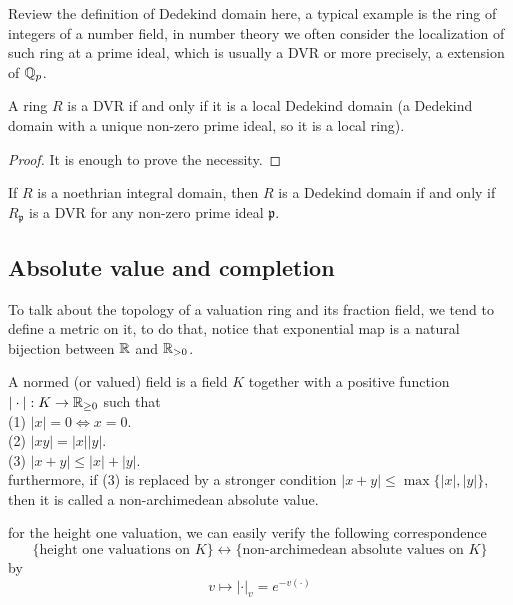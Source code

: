 Review the definition of Dedekind domain here, a typical example is the ring of integers of a number field, in number theory we often consider the localization of such ring at a prime ideal, which is usually a DVR or more precisely, a extension of \(\mathbb{Q}_p\).

\begin{proposition}
    A ring \(R\) is a DVR if and only if it is a local Dedekind domain (a Dedekind domain with a unique non-zero prime ideal, so it is a local ring).
\end{proposition}

\begin{proof}
    It is enough to prove the necessity.
\end{proof}

\begin{corollary}
    If \(R\) is a noethrian integral domain, then \(R\) is a Dedekind domain if and only if \(R_\mathfrak{p}\) is a DVR for any non-zero prime ideal \(\mathfrak{p}\).
\end{corollary}







\subsection{Absolute value and completion}

To talk about the topology of a valuation ring and its fraction field, we tend to define a metric on it, to do that, notice that exponential map is a natural bijection between \(\mathbb{R}\) and \(\mathbb{R}_{>0}\).

\begin{definition}
    A normed (or valued) field is a field \(K\) together with a positive function \(|\cdot|: K \to \mathbb{R}_{\geq 0}\) such that\\
    (1) \(|x| = 0 \iff x = 0\).\\
    (2) \(|xy| = |x||y|\).\\
    (3) \(|x+y| \leq |x| + |y|\).\\
    furthermore, if (3) is replaced by a stronger condition \(|x+y| \leq \max\{|x|,|y|\}\), then it is called a non-archimedean absolute value.
\end{definition}

for the height one valuation, we can easily verify the following correspondence 
\[\{\text{height one valuations on } K \} \longleftrightarrow  \{\text{non-archimedean absolute values on } K\}\]
by
\[v \mapsto |\cdot|_v = e^{-v(\cdot)}\]


